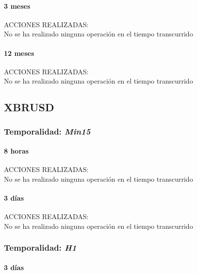 \paragraph{3 meses}

ACCIONES REALIZADAS:\\

No se ha realizado ninguna operación en el tiempo transcurrido

\paragraph{12 meses}

ACCIONES REALIZADAS:\\

No se ha realizado ninguna operación en el tiempo transcurrido





\subsection{XBRUSD}

\subsubsection{Temporalidad: \textit{Min15}}

\paragraph{8 horas}

ACCIONES REALIZADAS:\\

No se ha realizado ninguna operación en el tiempo transcurrido

\paragraph{3 días}

ACCIONES REALIZADAS:\\

No se ha realizado ninguna operación en el tiempo transcurrido

\subsubsection{Temporalidad: \textit{H1}}

\paragraph{3 días}

